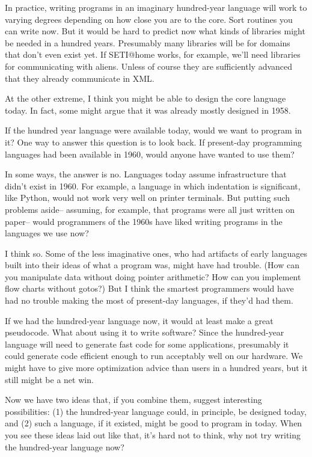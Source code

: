 In practice, writing programs in an imaginary hundred-year language will
work to varying degrees depending on how close you are to the core. Sort
routines you can write now. But it would be hard to predict now what
kinds of libraries might be needed in a hundred years. Presumably many
libraries will be for domains that don't even exist yet. If SETI@home
works, for example, we'll need libraries for communicating with aliens.
Unless of course they are sufficiently advanced that they already
communicate in XML.

At the other extreme, I think you might be able to design the core
language today. In fact, some might argue that it was already mostly
designed in 1958.

If the hundred year language were available today, would we want to
program in it? One way to answer this question is to look back. If
present-day programming languages had been available in 1960, would
anyone have wanted to use them?

In some ways, the answer is no. Languages today assume infrastructure
that didn't exist in 1960. For example, a language in which indentation
is significant, like Python, would not work very well on printer
terminals. But putting such problems aside-- assuming, for example, that
programs were all just written on paper-- would programmers of the 1960s
have liked writing programs in the languages we use now?

I think so. Some of the less imaginative ones, who had artifacts of
early languages built into their ideas of what a program was, might have
had trouble. (How can you manipulate data without doing pointer
arithmetic? How can you implement flow charts without gotos?) But I
think the smartest programmers would have had no trouble making the most
of present-day languages, if they'd had them.

If we had the hundred-year language now, it would at least make a great
pseudocode. What about using it to write software? Since the
hundred-year language will need to generate fast code for some
applications, presumably it could generate code efficient enough to run
acceptably well on our hardware. We might have to give more optimization
advice than users in a hundred years, but it still might be a net win.

Now we have two ideas that, if you combine them, suggest interesting
possibilities: (1) the hundred-year language could, in principle, be
designed today, and (2) such a language, if it existed, might be good to
program in today. When you see these ideas laid out like that, it's hard
not to think, why not try writing the hundred-year language now?

